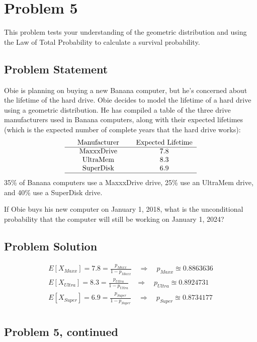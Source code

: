 \documentclass[12pt]{article}
\theoremstyle{definition}
\begin{document}
\newpage
\section*{Problem 5}

This problem tests your understanding of the geometric distribution and using the Law of Total Probability to calculate a survival probability.

\subsection*{Problem Statement}

Obie is planning on buying a new Banana computer, but he's concerned about the lifetime of the hard drive. Obie decides to model the lifetime of a hard drive using a geometric distribution. He has compiled a table of the three drive manufacturers used in Banana computers, along with their expected lifetimes (which is the expected number of complete years that the hard drive works):
$$
\begin{tabular}{ccccc}
& Manufacturer & & Expected Lifetime\\
\hline
& MaxxxDrive & & 7.8\\
& UltraMem & & 8.3\\
& SuperDisk & & 6.9\\
\hline
\end{tabular}
$$
35\% of Banana computers use a MaxxxDrive drive, 25\% use an UltraMem drive, and 40\% use a SuperDisk drive.

\bigskip
If Obie buys his new computer on January 1, 2018, what is the unconditional probability that the computer will still be working on January 1, 2024?


\subsection*{Problem Solution}
\begin{align*}
E[X_{Maxx}] = 7.8 = \frac{p_{Maxx}}{1 - p_{Maxx}} \quad\Rightarrow\quad p_{Maxx} \approxeq 0.8863636\\
E[X_{Ultra}] = 8.3 = \frac{p_{Ultra}}{1 - p_{Ultra}} \quad\Rightarrow\quad p_{Ultra} \approxeq 0.8924731 \\
E[X_{Super}] = 6.9 = \frac{p_{Super}}{1 - p_{Super}} \quad\Rightarrow\quad p_{Super} \approxeq 0.8734177\\
\end{align*}

\newpage
\subsection*{Problem 5, continued}
\end{document}

